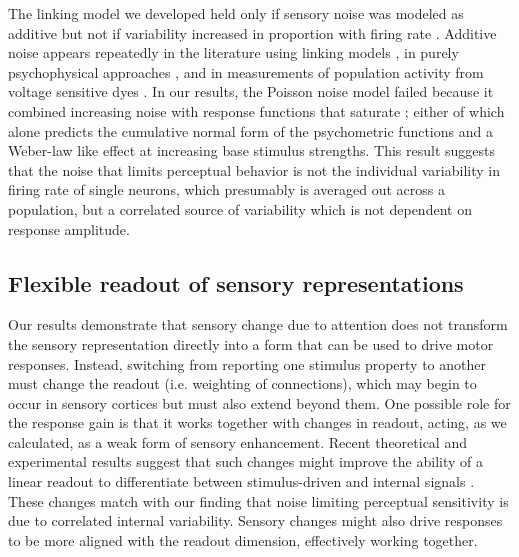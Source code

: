 The linking model we developed held only if sensory noise was modeled as additive but not if variability increased in proportion with firing rate \citep{Softky1993-ki}. Additive noise appears repeatedly in the literature using linking models \citep{Boynton1999-jd,Hara2014-mv,Pestilli2011-gi,Sapir2005-ri}, in purely psychophysical approaches \citep{Gorea2001-yt,Neri2010-hn,Neri2018-pu}, and in measurements of population activity from voltage sensitive dyes \citep{Chen2006-tt}. In our results, the Poisson noise model failed because it combined increasing noise with response functions that saturate \citep{Birman2018-sp}; either of which alone predicts the cumulative normal form of the psychometric functions and a Weber-law like effect at increasing base stimulus strengths. This result suggests that the noise that limits perceptual behavior is not the individual variability in firing rate of single neurons, which presumably is averaged out across a population, but a correlated source of variability which is not dependent on response amplitude.

\subsection{Flexible readout of sensory representations}

Our results demonstrate that sensory change due to attention does not transform the sensory representation directly into a form that can be used to drive motor responses. Instead, switching from reporting one stimulus property to another must change the readout (i.e. weighting of connections), which may begin to occur in sensory cortices \citep{Ruff2017-kl} but must also extend beyond them. One possible role for the response gain is that it works together with changes in readout, acting, as we calculated, as a weak form of sensory enhancement. Recent theoretical and experimental results suggest that such changes might improve the ability of a linear readout to differentiate between stimulus-driven and internal signals \citep{Ecker2016-ro,Rabinowitz2015-uz,Snyder2018-yr}. These changes match with our finding that noise limiting perceptual sensitivity is due to correlated internal variability. Sensory changes might also drive responses to be more aligned with the readout dimension, effectively working together.  

